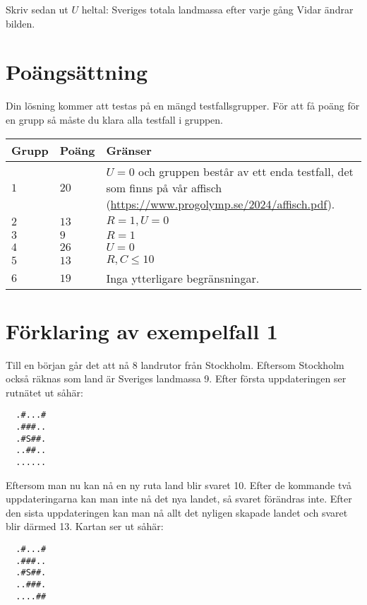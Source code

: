 Skriv sedan ut $U$ heltal: Sveriges totala landmassa efter varje gång Vidar ändrar bilden.

\section*{Poängsättning}
Din lösning kommer att testas på en mängd testfallsgrupper.
För att få poäng för en grupp så måste du klara alla testfall i gruppen.

\noindent
\begin{tabular}{| l | l | p{12cm} |}
  \hline
  \textbf{Grupp} & \textbf{Poäng} & \textbf{Gränser} \\ \hline
  $1$    & $20$       & $U=0$ och gruppen består av ett enda testfall, det som finns på vår affisch (\url{https://www.progolymp.se/2024/affisch.pdf}). \\ \hline
  $2$    & $13$       & $R=1, U=0$ \\ \hline
  $3$    & $9$        & $R=1$ \\ \hline
  $4$    & $26$       & $U=0$ \\ \hline
  $5$    & $13$       & $R,C \le 10$ \\ \hline
  $6$    & $19$       & Inga ytterligare begränsningar. \\ \hline
\end{tabular}

\section*{Förklaring av exempelfall 1}
Till en början går det att nå 8 landrutor från Stockholm. Eftersom Stockholm också räknas som land är Sveriges landmassa 9. Efter första uppdateringen ser rutnätet ut såhär:

\noindent
\begin{verbatim}
  .#...#
  .###..
  .#S##.
  ..##..
  ......
\end{verbatim}

\noindent
Eftersom man nu kan nå en ny ruta land blir svaret 10. Efter de kommande två uppdateringarna kan man inte nå det nya landet, så svaret förändras inte.
Efter den sista uppdateringen kan man nå allt det nyligen skapade landet och svaret blir därmed 13. Kartan ser ut såhär:

\noindent
\begin{verbatim}
  .#...#
  .###..
  .#S##.
  ..###.
  ....##
\end{verbatim}